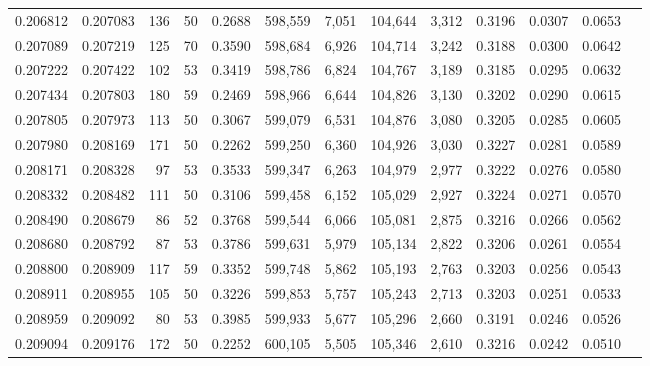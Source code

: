 \begin{tabular}{rrrrrrrrrrrrr}
0.206812 & 0.207083 &   136 &  50 &                                     0.2688 & 598,559 &   7,051 & 104,644 &   3,312 & 0.3196 & 0.0307 & 0.0653 \\
0.207089 & 0.207219 &   125 &  70 &                                     0.3590 & 598,684 &   6,926 & 104,714 &   3,242 & 0.3188 & 0.0300 & 0.0642 \\
0.207222 & 0.207422 &   102 &  53 &                                     0.3419 & 598,786 &   6,824 & 104,767 &   3,189 & 0.3185 & 0.0295 & 0.0632 \\
0.207434 & 0.207803 &   180 &  59 &                                     0.2469 & 598,966 &   6,644 & 104,826 &   3,130 & 0.3202 & 0.0290 & 0.0615 \\
0.207805 & 0.207973 &   113 &  50 &                                     0.3067 & 599,079 &   6,531 & 104,876 &   3,080 & 0.3205 & 0.0285 & 0.0605 \\
0.207980 & 0.208169 &   171 &  50 &                                     0.2262 & 599,250 &   6,360 & 104,926 &   3,030 & 0.3227 & 0.0281 & 0.0589 \\
0.208171 & 0.208328 &    97 &  53 &                                     0.3533 & 599,347 &   6,263 & 104,979 &   2,977 & 0.3222 & 0.0276 & 0.0580 \\
0.208332 & 0.208482 &   111 &  50 &                                     0.3106 & 599,458 &   6,152 & 105,029 &   2,927 & 0.3224 & 0.0271 & 0.0570 \\
0.208490 & 0.208679 &    86 &  52 &                                     0.3768 & 599,544 &   6,066 & 105,081 &   2,875 & 0.3216 & 0.0266 & 0.0562 \\
0.208680 & 0.208792 &    87 &  53 &                                     0.3786 & 599,631 &   5,979 & 105,134 &   2,822 & 0.3206 & 0.0261 & 0.0554 \\
0.208800 & 0.208909 &   117 &  59 &                                     0.3352 & 599,748 &   5,862 & 105,193 &   2,763 & 0.3203 & 0.0256 & 0.0543 \\
0.208911 & 0.208955 &   105 &  50 &                                     0.3226 & 599,853 &   5,757 & 105,243 &   2,713 & 0.3203 & 0.0251 & 0.0533 \\
0.208959 & 0.209092 &    80 &  53 &                                     0.3985 & 599,933 &   5,677 & 105,296 &   2,660 & 0.3191 & 0.0246 & 0.0526 \\
0.209094 & 0.209176 &   172 &  50 &                                     0.2252 & 600,105 &   5,505 & 105,346 &   2,610 & 0.3216 & 0.0242 & 0.0510 \\

\end{tabular}
